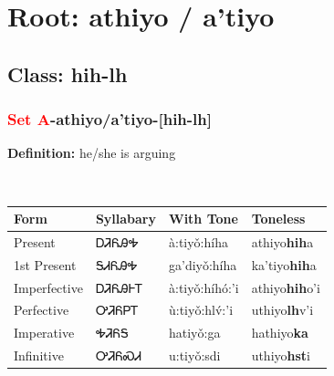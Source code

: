 \needspace{4in}
\section*{Root: athiyo / a'tiyo}
\nopagebreak
{}
\needspace{3in}
\subsection*{Class: hih-lh}
\nopagebreak
\needspace{2in}
\subsubsection*{\textcolor{Red}{Set A}{-}\textbf{athiyo/a'tiyo}{-}[hih-lh]}
\nopagebreak
\textbf{Definition: } he/she is arguing
\\[0.5em]
\begin{tabularx}{\textwidth}{l X X X}%
\toprule%
\textbf{Form}&\textbf{Syllabary}&\textbf{With Tone}&\textbf{Toneless}\\%
\midrule%
Present&ᎠᏘᏲᎯᎭ&à:tiyǒ:híha&athiyo\textbf{hih}a\\%
1st Present&ᎦᏗᏲᎯᎭ&ga’diyǒ:híha&ka'tiyo\textbf{hih}a\\%
Imperfective&ᎠᏘᏲᎯᎰᎢ&à:tiyǒ:híhó:’i&athiyo\textbf{hih}o'i\\%
Perfective&ᎤᏘᏲᏢᎢ&ù:tiyǒ:hlv́:’i&uthiyo\textbf{lh}v'i\\%
Imperative&ᎭᏘᏲᎦ&hatiyǒ:ga&hathiyo\textbf{ka}\\%
Infinitive&ᎤᏘᏲᏍᏗ&u:tiyǒ:sdi&uthiyo\textbf{hst}i\\%
\bottomrule%
\end{tabularx}
\\[1em]